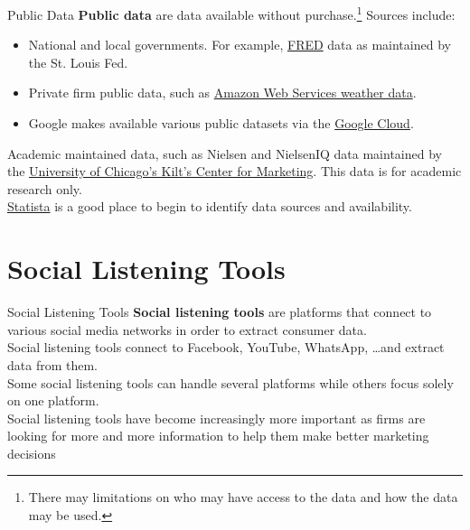 \documentclass[pdf]{beamer}
\newcommand{\empr}[1]{{\color{franklinblue}\textbf{#1}}}
\theoremstyle{remark}
\theoremstyle{definition}
\begin{document}
\begin{frame}[t]{Public Data}
\empr{Public data} are data available without purchase.\footnote{There may limitations on who may have access to the data and how the data may be used.} Sources include:\\
\vspace{-0.5ex}
\small
\begin{itemize}
  \item National and local governments.  For example, \href{https://fred.stlouisfed.org/}{FRED} data as maintained by the St. Louis Fed.
  \item Private firm public data, such as \href{https://docs.aws.amazon.com/forecast/latest/dg/weather.html}{Amazon Web Services weather data}.
  \item Google makes available various public datasets via the \href{https://console.cloud.google.com/marketplace/browse?filter=solution-type:dataset&_ga=2.201899609.935088507.1674489775-2008566173.1674489775}{Google Cloud}.
 \end{itemize}
 \normalsize
 \vspace{-0.5ex}
 Academic maintained data, such as Nielsen and NielsenIQ data maintained by the \href{https://www.chicagobooth.edu/research/kilts/research-data}{University of Chicago's Kilt's Center for Marketing}.  This data is for academic research only. \\
\vspace{1.5ex}
\href{https://www.statista.com/}{Statista}  is a good place to begin to identify data sources and availability. 
\end{frame}

\section{Social Listening Tools}

\begin{frame}[t]{Social Listening Tools}
\empr{Social listening tools} are platforms that connect to various social media networks in order to extract consumer data.  \\
\vspace{1.5ex}
Social listening tools connect to Facebook, YouTube, WhatsApp, \ldots and extract data from them. \\
\vspace{1.5ex}
Some social listening tools can handle several platforms while others focus solely on one platform. \\
\vspace{1.5ex}
Social listening tools have become increasingly more important as firms are looking for more and more information to help them make better marketing decisions
\end{frame}
\end{document}
